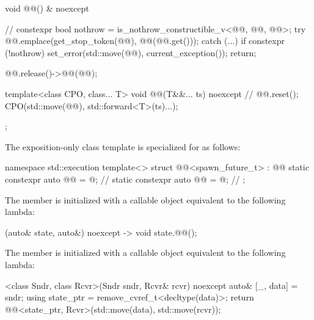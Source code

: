 \begin{codeblock}
{{    void @@() & noexcept {                                     // \expos
      constexpr bool nothrow =
        is_nothrow_constructible_v<@@, @@, @@>;
      try {
        @@.emplace(get_stop_token(@@), @@(@@.get()));
      }
      catch (...) {
        if constexpr (!nothrow) {
          set_error(std::move(@@), current_exception());
          return;
        }
      }

      @@.release()->@@(@@);
    }

    template<class CPO, class... T>
    void @@(T&&... ts) noexcept {                     // \expos
      @@.reset();
      CPO{}(std::move(@@), std::forward<T>(ts)...);
    }
  };
}
\end{codeblock}

\pnum
The exposition-only class template 
is specialized for  as follows:

%
\begin{codeblock}
namespace std::execution {
  template<>
  struct @@<spawn_future_t> : @@ {
    static constexpr auto @@ = @\seebelow@;                    // \expos
    static constexpr auto @@ = @\seebelow@;                // \expos
  };
}
\end{codeblock}

\pnum
The member 
is initialized with a callable object equivalent to the following lambda:
\begin{codeblock}
[](auto& state, auto&) noexcept -> void {
  state.@@();
}
\end{codeblock}

\pnum
The member 
is initialized with a callable object equivalent to the following lambda:
\begin{codeblock}
[]<class Sndr, class Rcvr>(Sndr sndr, Rcvr& rcvr) noexcept {
  auto& [_, data] = sndr;
  using state_ptr = remove_cvref_t<decltype(data)>;
  return @@<state_ptr, Rcvr>(std::move(data), std::move(rcvr));
}
\end{codeblock}

